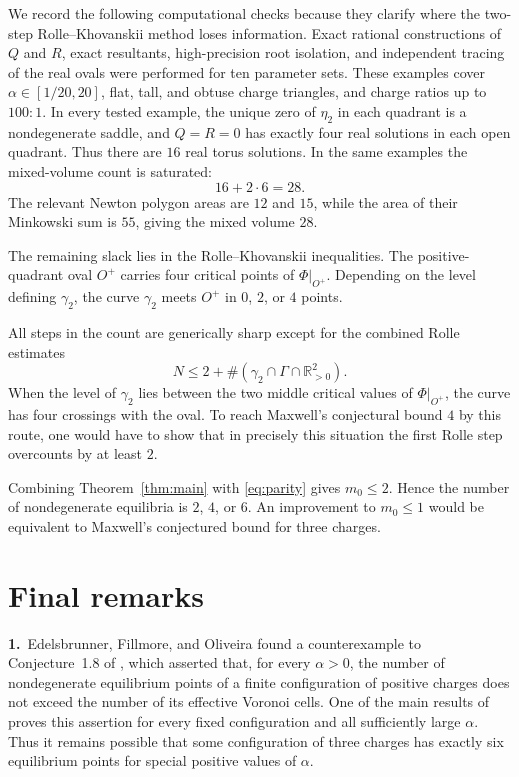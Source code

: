 \documentclass[10pt,reqno]{amsart}
\numberwithin{equation}{section}
\theoremstyle{plain}
\theoremstyle{remark}
\newcommand{\R}{\mathbb{R}}
\newcommand{\Qpos}{\R_{>0}^{2}}
\newcommand{\restr}[2]{#1\big|_{#2}}
\begin{document}
We record the following computational checks because they clarify where
the two-step Rolle--Khovanskii method loses information.  Exact rational constructions
of $Q$ and $R$, exact resultants, high-precision
root isolation, and independent tracing of the real ovals were
performed for ten parameter sets.  These examples cover
$\alpha\in[1/20,20]$, flat, tall, and obtuse charge triangles, and charge
ratios up to $100:1$.  In every tested example, the unique zero of
$\eta_2$ in each quadrant is a nondegenerate saddle, and $Q=R=0$ has
exactly four real solutions in each open quadrant.  Thus there are
$16$ real torus solutions.  In the same examples the mixed-volume count
is saturated:
\begin{equation}\label{eq:saturation}
  16+2\cdot6=28.
\end{equation}
The relevant Newton polygon areas are $12$ and $15$, while the area of
their Minkowski sum is $55$, giving the mixed volume $28$.

The remaining slack lies in the Rolle--Khovanskii inequalities.  The
positive-quadrant oval $O^+$ carries four critical points of
$\restr{\Phi}{O^+}$.  Depending on the level defining $\gamma_2$, the
curve $\gamma_2$ meets $O^+$ in $0$, $2$, or $4$ points.

All steps in the count are generically sharp except for the combined
Rolle estimates
\begin{equation}\label{eq:remaining-slack}
  N\leq2+\#(\gamma_2\cap\Gamma\cap\Qpos).
\end{equation}
When the level of $\gamma_2$ lies between the two middle critical values
of $\restr{\Phi}{O^+}$, the curve has four crossings with the oval.  To
reach Maxwell's conjectural bound $4$ by this route, one would have to
show that in precisely this situation the first Rolle step overcounts by
at least $2$.

Combining Theorem~\ref{thm:main} with \eqref{eq:parity} gives
$m_0\leq2$.  Hence the number of nondegenerate equilibria is $2$, $4$, or
$6$.  An improvement to $m_0\leq1$ would be equivalent to Maxwell's
conjectured bound for three charges.

\section{Final remarks}

\noindent
{\bf 1.} Edelsbrunner, Fillmore, and Oliveira \cite{Edel} found a counterexample
to Conjecture~1.8 of \cite{GNS}, which asserted that, for every
$\alpha>0$, the number of nondegenerate equilibrium points of a finite
configuration of positive charges does not exceed the number of its
effective Voronoi cells.  One of the main results of \cite{GNS} proves
this assertion for every fixed configuration and all sufficiently large
$\alpha$.  Thus it remains possible that some configuration of three
charges has exactly six equilibrium points for special positive values of
$\alpha$.
\end{document}

